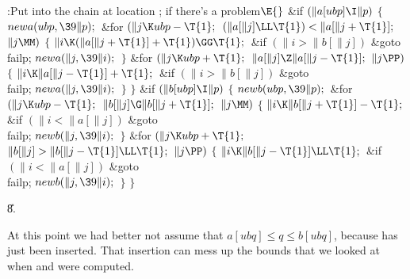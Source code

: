 \Y\B\4:Put  into the chain at location ;  if there's a problem\X${}\E{}$\6
\&{if} ${}(\|a[\\{ubp}]\I\|p){}$\5
${}\{{}$\1\6
${}\\{newa}(\\{ubp},\39\|p);{}$\6
\&{for} ${}(\|j\K\\{ubp}-\T{1};{}$ ${}(\|a[\|j]\LL\T{1})<\|a[\|j+\T{1}];{}$ ${}%
\|j\MM){}$\5
${}\{{}$\1\6
${}\|i\K(\|a[\|j+\T{1}]+\T{1})\GG\T{1};{}$\6
\&{if} ${}(\|i>\|b[\|j]){}$\1\5
\&{goto} \\{failp};\2\6
${}\\{newa}(\|j,\39\|i);{}$\6
\4${}\}{}$\2\6
\&{for} ${}(\|j\K\\{ubp}+\T{1};{}$ ${}\|a[\|j]\Z\|a[\|j-\T{1}];{}$ ${}\|j%
\PP){}$\5
${}\{{}$\1\6
${}\|i\K\|a[\|j-\T{1}]+\T{1};{}$\6
\&{if} ${}(\|i>\|b[\|j]){}$\1\5
\&{goto} \\{failp};\2\6
${}\\{newa}(\|j,\39\|i);{}$\6
\4${}\}{}$\2\6
\4${}\}{}$\2\6
\&{if} ${}(\|b[\\{ubp}]\I\|p){}$\5
${}\{{}$\1\6
${}\\{newb}(\\{ubp},\39\|p);{}$\6
\&{for} ${}(\|j\K\\{ubp}-\T{1};{}$ ${}\|b[\|j]\G\|b[\|j+\T{1}];{}$ ${}\|j%
\MM){}$\5
${}\{{}$\1\6
${}\|i\K\|b[\|j+\T{1}]-\T{1};{}$\6
\&{if} ${}(\|i<\|a[\|j]){}$\1\5
\&{goto} \\{failp};\2\6
${}\\{newb}(\|j,\39\|i);{}$\6
\4${}\}{}$\2\6
\&{for} ${}(\|j\K\\{ubp}+\T{1};{}$ ${}\|b[\|j]>\|b[\|j-\T{1}]\LL\T{1};{}$ ${}%
\|j\PP){}$\5
${}\{{}$\1\6
${}\|i\K\|b[\|j-\T{1}]\LL\T{1};{}$\6
\&{if} ${}(\|i<\|a[\|j]){}$\1\5
\&{goto} \\{failp};\2\6
${}\\{newb}(\|j,\39\|i);{}$\6
\4${}\}{}$\2\6
\4${}\}{}$\2\par
\U8.\fi

At this point we had better not assume that $a[ubq]\le q%
\le b[ubq]$,
because  has just been inserted. That insertion can mess up the
bounds that we looked at when  and  were computed.

